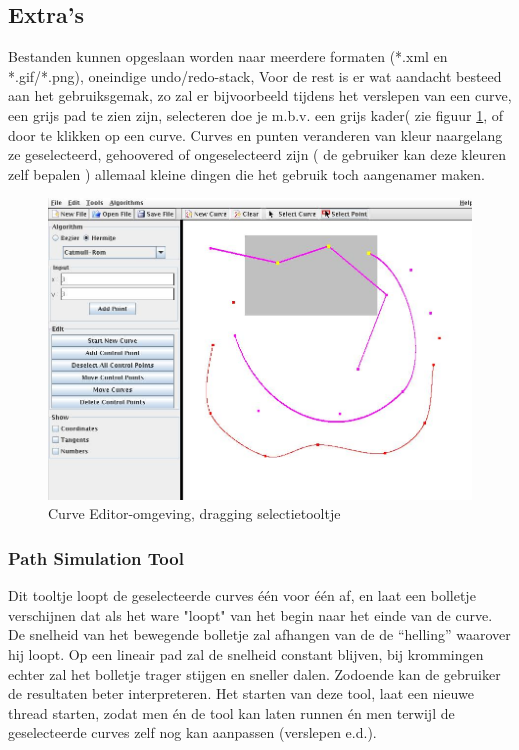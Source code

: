 \documentclass[a4paper,11pt,oneside, titlepage]{article}
\begin{document}
\subsection{Extra's}
Bestanden kunnen opgeslaan worden naar meerdere formaten (*.xml en *.gif/*.png), oneindige undo/redo-stack, Voor de rest is er wat aandacht besteed aan het gebruiksgemak, zo zal er bijvoorbeeld tijdens het verslepen van een curve, een grijs pad te zien zijn, selecteren doe je m.b.v. een grijs kader( zie figuur \ref{scrSel}, of door te klikken op een curve. Curves en punten veranderen van kleur naargelang ze geselecteerd, gehoovered of ongeselecteerd zijn ( de gebruiker kan deze kleuren zelf bepalen ) allemaal kleine dingen die het gebruik toch aangenamer maken.
\begin{figure}[htbp]
\centering
\includegraphics[scale=0.4]{./screenies/selectPoint.jpg}
\caption{Curve Editor-omgeving, dragging selectietooltje}\label{scrSel}
\end{figure}
\subsubsection{Path Simulation Tool}
Dit tooltje loopt de geselecteerde curves \'e\'en voor \'e\'en af, en laat een bolletje verschijnen dat als het ware "loopt" van het begin naar het einde van de curve. 
De snelheid van het bewegende bolletje zal afhangen van de de ``helling'' waarover hij loopt.
Op een lineair pad zal de snelheid constant blijven, bij krommingen echter zal het bolletje
trager stijgen en sneller dalen. Zodoende kan de gebruiker de resultaten beter interpreteren.
Het starten van deze tool, laat een nieuwe thread starten, zodat men \'en de tool kan laten runnen \'en men terwijl de geselecteerde curves zelf nog kan aanpassen (verslepen e.d.). 
\end{document}
